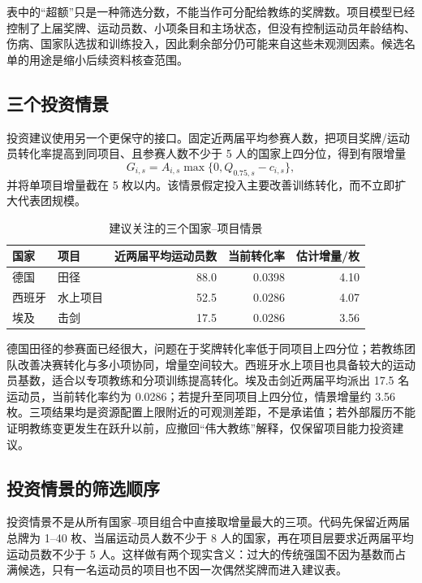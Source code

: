 \documentclass[UTF8,11pt,a4paper]{ctexart}
\begin{document}
表中的“超额”只是一种筛选分数，不能当作可分配给教练的奖牌数。项目模型已经控制了上届奖牌、运动员数、小项条目和主场状态，但没有控制运动员年龄结构、伤病、国家队选拔和训练投入，因此剩余部分仍可能来自这些未观测因素。候选名单的用途是缩小后续资料核查范围。

\subsection{三个投资情景}

投资建议使用另一个更保守的接口。固定近两届平均参赛人数，把项目奖牌/运动员转化率提高到同项目、且参赛人数不少于 5 人的国家上四分位，得到有限增量
\begin{equation}
G_{i,s}=A_{i,s}\max\{0,Q_{0.75,s}-c_{i,s}\},
\end{equation}
并将单项目增量截在 5 枚以内。该情景假定投入主要改善训练转化，而不立即扩大代表团规模。

\begin{table}[H]
\centering
\caption{建议关注的三个国家--项目情景}
\label{tab:coach}
\begin{tabular}{llrrr}
\toprule
国家 & 项目 & 近两届平均运动员数 & 当前转化率 & 估计增量/枚\\
\midrule
德国 & 田径 & 88.0 & 0.0398 & 4.10\\
西班牙 & 水上项目 & 52.5 & 0.0286 & 4.07\\
埃及 & 击剑 & 17.5 & 0.0286 & 3.56\\
\bottomrule
\end{tabular}
\end{table}

德国田径的参赛面已经很大，问题在于奖牌转化率低于同项目上四分位；若教练团队改善决赛转化与多小项协同，增量空间较大。西班牙水上项目也具备较大的运动员基数，适合以专项教练和分项训练提高转化。埃及击剑近两届平均派出 17.5 名运动员，当前转化率约为 0.0286；若提升至同项目上四分位，情景增量约 3.56 枚。三项结果均是资源配置上限附近的可观测差距，不是承诺值；若外部履历不能证明教练变更发生在跃升以前，应撤回“伟大教练”解释，仅保留项目能力投资建议。

\subsection{投资情景的筛选顺序}

投资情景不是从所有国家--项目组合中直接取增量最大的三项。代码先保留近两届总牌为 1--40 枚、当届运动员人数不少于 8 人的国家，再在项目层要求近两届平均运动员数不少于 5 人。这样做有两个现实含义：过大的传统强国不因为基数而占满候选，只有一名运动员的项目也不因一次偶然奖牌而进入建议表。
\end{document}

